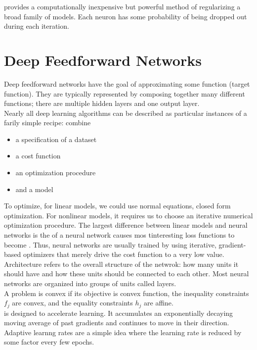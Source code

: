 \documentclass{article}
\begin{document}
 provides a computationally inexpensive but powerful method of regularizing a broad family of models. Each neuron has some probability of being dropped out during each iteration. 

\section{Deep Feedforward Networks}

Deep feedforward networks have the goal of approximating some function (target function). They are typically represented by composing together many different functions; there are multiple hidden layers and one output layer. \\ 

Nearly all deep learning algorithms can be described as particular instances of a farily simple recipe: combine 
\begin{itemize}
  \item a specification of a dataset 
  \item a cost function 
  \item an optimization procedure 
  \item and a model
\end{itemize}
To optimize, for linear models, we could use normal equations, closed form optimization. For nonlinear models, it requires us to choose an iterative numerical optimization procedure. The largest difference between linear models and neural networks is the  of a neural network causes mos tinteresting loss functions to become . Thus, neural networks are usually trained by using iterative, gradient-based optimizers that merely drive the cost function to a very low value. \\ 

Architecture refers to the overall structure of the netwrok: how many units it should have and how these units should be connected to each other. Most neural networks are organized into groups of units called layers. \\ 

 A problem is convex if its objective is convex function, the inequality constraints $f_j$ are convex, and the equality constraints $h_j$ are affine. \\ 

 is designed to accelerate learning. It accumulates an exponentially decaying moving average of past gradients and continues to move in their direction. Adaptive learnng rates are a simple idea where the learning rate is reduced by some factor every few epochs. 
\end{document}
